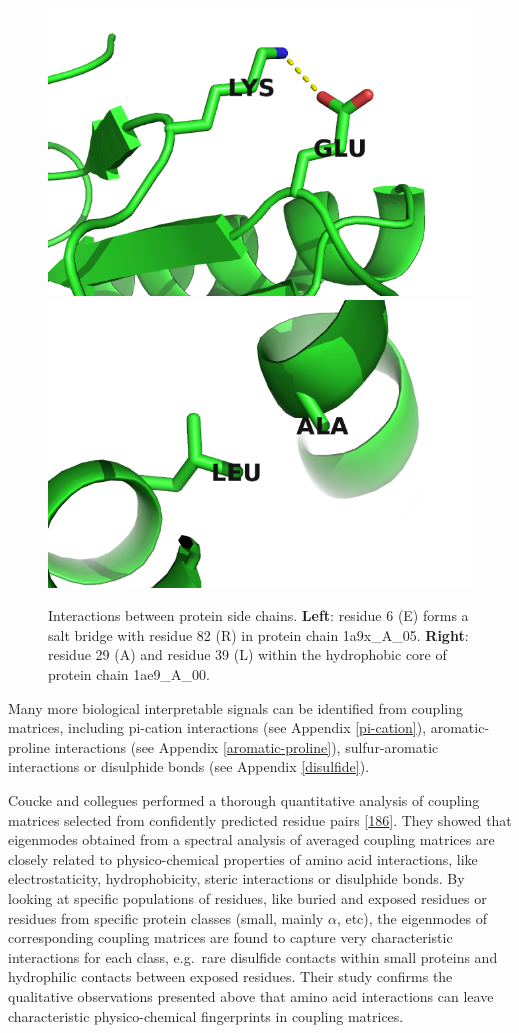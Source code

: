 \documentclass[11pt,a4paper,twoside]{book}
\theoremstyle{definition}
\theoremstyle{definition}
\theoremstyle{remark}
\begin{document}
\begin{figure}
\includegraphics[width=0.5\linewidth]{img/coupling_matrix_analysis/1a9xA05_6_82} \includegraphics[width=0.5\linewidth]{img/coupling_matrix_analysis/1ae9A00_29_39} \caption{Interactions between protein side
chains. \textbf{Left}: residue 6 (E) forms a salt bridge with residue 82
(R) in protein chain 1a9x\_A\_05. \textbf{Right}: residue 29 (A) and
residue 39 (L) within the hydrophobic core of protein chain 1ae9\_A\_00.}\label{fig:coupling-matrix-pymol}
\end{figure}

Many more biological interpretable signals can be identified from
coupling matrices, including pi-cation interactions (see Appendix
\ref{pi-cation}), aromatic-proline interactions (see Appendix
\ref{aromatic-proline}), sulfur-aromatic interactions or disulphide
bonds (see Appendix \ref{disulfide}).

Coucke and collegues performed a thorough quantitative analysis of
coupling matrices selected from confidently predicted residue pairs
{[}\protect\hyperlink{ref-Coucke2016}{186}{]}. They showed that
eigenmodes obtained from a spectral analysis of averaged coupling
matrices are closely related to physico-chemical properties of amino
acid interactions, like electrostaticity, hydrophobicity, steric
interactions or disulphide bonds. By looking at specific populations of
residues, like buried and exposed residues or residues from specific
protein classes (small, mainly \(\alpha\), etc), the eigenmodes of
corresponding coupling matrices are found to capture very characteristic
interactions for each class, e.g.~rare disulfide contacts within small
proteins and hydrophilic contacts between exposed residues. Their study
confirms the qualitative observations presented above that amino acid
interactions can leave characteristic physico-chemical fingerprints in
coupling matrices.
\end{document}
